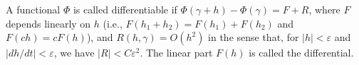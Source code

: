 A functional $\Phi$ is called differentiable if $\Phi(\gamma + h) - \Phi(\gamma) = F + R$, where $F$ depends linearly on $h$ (i.e., $F(h_1 + h_2) = F(h_1) + F(h_2)$ and $F(ch) = cF(h)$), and $R(h, \gamma) = O(h^2)$ in the sense that, for $|h| < \varepsilon$ and $|dh/dt| < \varepsilon$, we have $|R| < C\varepsilon^2$. The linear part $F(h)$ is called the differential.
